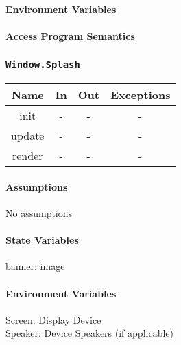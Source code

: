 \documentclass[11pt, oneside]{article}   	%
\begin{document}
\paragraph{Environment Variables}




\paragraph{Access Program Semantics} 


\subsubsection{\texttt{Window.Splash}}



\begin{center}
\begin{tabular}{ |c|c|c|c| } 
 \hline
 Name & In & Out & Exceptions \\ 
 \hline \hline
 init & - & - & - \\ 
 update & - & - & - \\ 
 render & - & - & - \\ 

 \hline
\end{tabular}
\end{center}

\paragraph{Assumptions}
No assumptions

\paragraph{State Variables}
banner: image\\



\paragraph{Environment Variables}
Screen: Display Device\\
Speaker: Device Speakers (if applicable)\\
\end{document}
